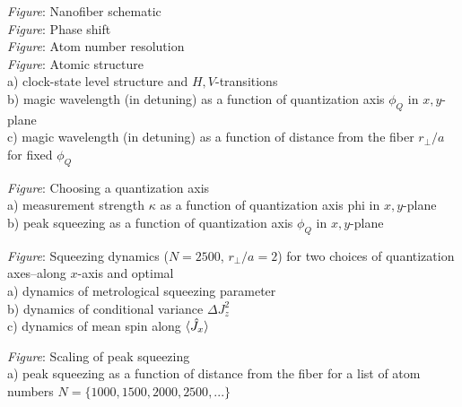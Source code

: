 \documentclass[preprint,aps,pra,onecolumn]{revtex4-1} %
\newcommand{\comment}[1]{{\color{Maroon} #1}}
\begin{document}
\comment{
\emph{Figure}: Nanofiber schematic \\

\emph{Figure}: Phase shift \\

\emph{Figure}: Atom number resolution \\

\emph{Figure}: Atomic structure \\
a) clock-state level structure and $H,V$-transitions \\
b) magic wavelength (in detuning) as a function of quantization axis $\phi_Q$ in $x,y$-plane \\
c) magic wavelength (in detuning) as a function of distance from the fiber $r_\perp/a$ for fixed $\phi_Q$ 

\emph{Figure}: Choosing a quantization axis\\
a) measurement strength $\kappa$ as a function of quantization axis phi in $x,y$-plane\\
b) peak squeezing as a function of quantization axis $\phi_Q$ in $x,y$-plane

\emph{Figure}:  Squeezing dynamics ($N=2500$, $r_\perp/a = 2$) for two choices of quantization axes--along $x$-axis and optimal\\
a) dynamics of metrological squeezing parameter \\
b) dynamics of conditional variance $\Delta J_z^2$ \\
c) dynamics of mean spin along $\langle{\hat{J}_x}\rangle$

\emph{Figure}:  Scaling of peak squeezing\\
a) peak squeezing as a function of distance from the fiber for a list of atom numbers $N= \{1000,1500,2000,2500,...\}$
}
\end{document}
